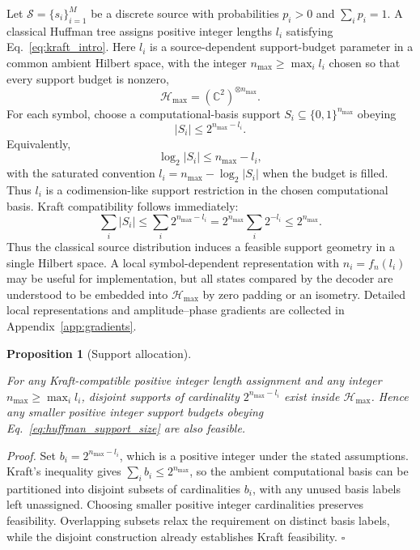 \documentclass[
 reprint,
 amsmath,amssymb,
 aps,
 pra,
 floatfix,
]{revtex4-2}
\newtheorem{proposition}[theorem]{Proposition}
\begin{document}
Let $\mathcal S=\{s_i\}_{i=1}^M$ be a discrete source with probabilities $p_i>0$ and $\sum_i p_i=1$. A classical Huffman tree assigns positive integer lengths $l_i$ satisfying Eq.~\eqref{eq:kraft_intro}. Here $l_i$ is a source-dependent support-budget parameter in a common ambient Hilbert space, with the integer $n_{\max}\geq\max_i l_i$ chosen so that every support budget is nonzero,
\begin{equation}
    \mathcal H_{\max}=(\mathbb C^2)^{\otimes n_{\max}}.
\end{equation}
For each symbol, choose a computational-basis support $S_i\subseteq\{0,1\}^{n_{\max}}$ obeying
\begin{equation}
    |S_i|\le 2^{n_{\max}-l_i}.
    \label{eq:huffman_support_size}
\end{equation}
Equivalently,
\begin{equation}
    \log_2|S_i|\le n_{\max}-l_i,
\end{equation}
with the saturated convention $l_i=n_{\max}-\log_2|S_i|$ when the budget is filled. Thus $l_i$ is a codimension-like support restriction in the chosen computational basis.
Kraft compatibility follows immediately:
\begin{equation}
    \sum_i |S_i|\le \sum_i2^{n_{\max}-l_i}=2^{n_{\max}}\sum_i2^{-l_i}\le 2^{n_{\max}}.
    \label{eq:support_kraft_compatibility}
\end{equation}
Thus the classical source distribution induces a feasible support geometry in a single Hilbert space. A local symbol-dependent representation with $n_i=f_n(l_i)$ may be useful for implementation, but all states compared by the decoder are understood to be embedded into $\mathcal H_{\max}$ by zero padding or an isometry. Detailed local representations and amplitude--phase gradients are collected in Appendix~\ref{app:gradients}.

\begin{proposition}[Support allocation]\label{prop:support-allocation}\hfill\par
For any Kraft-compatible positive integer length assignment and any integer \(n_{\max}\geq\max_i l_i\), disjoint supports of cardinality \(2^{n_{\max}-l_i}\) exist inside \(\mathcal H_{\max}\). Hence any smaller positive integer support budgets obeying Eq.~\eqref{eq:huffman_support_size} are also feasible.
\end{proposition}
\textit{Proof.} Set \(b_i=2^{n_{\max}-l_i}\), which is a positive integer under the stated assumptions. Kraft's inequality gives \(\sum_i b_i\leq 2^{n_{\max}}\), so the ambient computational basis can be partitioned into disjoint subsets of cardinalities \(b_i\), with any unused basis labels left unassigned. Choosing smaller positive integer cardinalities preserves feasibility. Overlapping subsets relax the requirement on distinct basis labels, while the disjoint construction already establishes Kraft feasibility. \(\square\)
\end{document}
